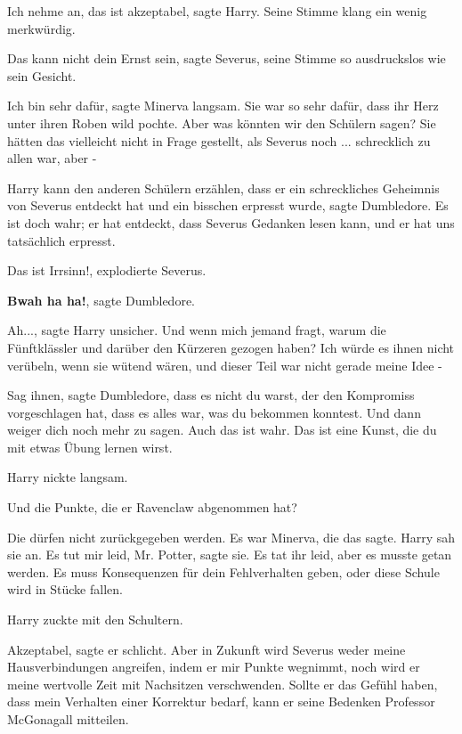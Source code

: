 \glqq Ich nehme an, das ist akzeptabel\grqq{}, sagte Harry. Seine Stimme klang
ein wenig merkwürdig.

\glqq Das kann nicht dein Ernst sein\grqq{}, sagte Severus, seine Stimme so
ausdruckslos wie sein Gesicht.

\glqq Ich bin sehr dafür\grqq{}, sagte Minerva langsam. Sie war so sehr dafür,
dass ihr Herz unter ihren Roben wild pochte. \glqq Aber was könnten wir den
Schülern sagen? Sie hätten das vielleicht nicht in Frage gestellt, als Severus
noch ... schrecklich zu allen war, aber -\grqq{}

\glqq Harry kann den anderen Schülern erzählen, dass er ein schreckliches
Geheimnis von Severus entdeckt hat und ein bisschen erpresst wurde\grqq{}, sagte
Dumbledore. \glqq Es ist doch wahr; er hat entdeckt, dass Severus Gedanken lesen
kann, und er hat uns tatsächlich erpresst.\grqq{}

\glqq Das ist Irrsinn!\grqq{}, explodierte Severus.

\glqq \textbf{Bwah ha ha!}\grqq{}, sagte Dumbledore.

\glqq Ah...\grqq{}, sagte Harry unsicher. \glqq Und wenn mich jemand fragt,
warum die Fünftklässler und darüber den Kürzeren gezogen haben? Ich würde es
ihnen nicht verübeln, wenn sie wütend wären, und dieser Teil war nicht gerade
meine Idee -\grqq{}

\glqq Sag ihnen\grqq{}, sagte Dumbledore, \glqq dass es nicht du warst, der den
Kompromiss vorgeschlagen hat, dass es alles war, was du bekommen konntest. Und
dann weiger dich noch mehr zu sagen. Auch das ist wahr. Das ist eine Kunst, die
du mit etwas Übung lernen wirst.\grqq{}

Harry nickte langsam.

\glqq Und die Punkte, die er Ravenclaw abgenommen hat?\grqq{}

\glqq Die dürfen nicht zurückgegeben werden.\grqq{} Es war Minerva, die das
sagte. Harry sah sie an. \glqq Es tut mir leid, Mr. Potter\grqq{}, sagte sie. Es
tat ihr leid, aber es musste getan werden. \glqq Es muss Konsequenzen für dein
Fehlverhalten geben, oder diese Schule wird in Stücke fallen.\grqq{}

Harry zuckte mit den Schultern.

\glqq Akzeptabel\grqq{}, sagte er schlicht. \glqq Aber in Zukunft wird Severus
weder meine Hausverbindungen angreifen, indem er mir Punkte wegnimmt, noch wird
er meine wertvolle Zeit mit Nachsitzen verschwenden. Sollte er das Gefühl haben,
dass mein Verhalten einer Korrektur bedarf, kann er seine Bedenken Professor
McGonagall mitteilen.\grqq{}

